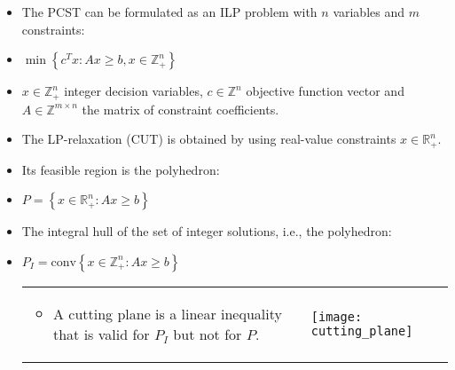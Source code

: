 \documentclass[11pt, a4paper, landscape]{article}
\begin{document}
\NewPage{}
\vfill
\begin{itemize}
\item The PCST can be formulated as an ILP problem with $n$ variables and $m$ constraints:
\item[]
\begin{center}
$\min \left\lbrace c^Tx : Ax \geq b, x \in \mathbb{Z}_+^n \right\rbrace $
\end{center}
\item $x \in \mathbb{Z}_+^n$ integer decision variables, $c \in \mathbb{Z}^n$ objective function vector and $A \in \mathbb{Z}^{m \times n}$ the matrix of constraint coefficients.
\item The LP-relaxation (CUT) is obtained by using real-value constraints $x \in \mathbb{R}_+^n$.
\item Its feasible region is the polyhedron:
\item[]
\begin{center}
$P = \left\lbrace x \in \mathbb{R}_+^n : Ax \geq b \right\rbrace $
\end{center}
\item The integral hull of the set of integer solutions, i.e., the polyhedron:
\item[]
\begin{center}
$P_I = \mbox{conv} \left\lbrace x \in \mathbb{Z}_+^n : Ax \geq b \right\rbrace $
\end{center}
\begin{table}
  \centering
  \begin{tabular}{@{} M{.5\linewidth} M{.5\linewidth} @{}}
  \begin{itemize}
  	\item A cutting plane is a linear inequality that is valid for $P_I$ but not for $P$.
  \end{itemize}
      &
    \texttt{[image: cutting\_plane]}
  \end{tabular}
\end{table}
\end{itemize}
\vfill
\end{document}

